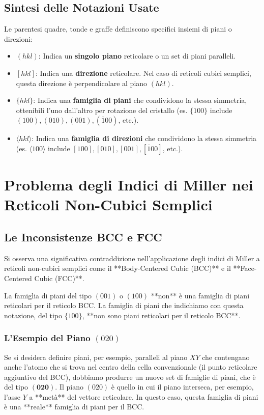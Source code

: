 \subsection{Sintesi delle Notazioni Usate}

Le parentesi quadre, tonde e graffe definiscono specifici insiemi di piani o direzioni:

\begin{itemize}
    \item \textbf{$(hkl)$}: Indica un \textbf{singolo piano} reticolare o un set di piani paralleli.
    \item \textbf{$[hkl]$}: Indica una \textbf{direzione} reticolare. Nel caso di reticoli cubici semplici, questa direzione è perpendicolare al piano $(hkl)$.
    \item \textbf{$\{hkl\}$}: Indica una \textbf{famiglia di piani} che condividono la stessa simmetria, ottenibili l'uno dall'altro per rotazione del cristallo (es. $\{100\}$ include $(100), (010), (001), (\bar{1}00)$, etc.).
    \item \textbf{$\langle hkl \rangle$}: Indica una \textbf{famiglia di direzioni} che condividono la stessa simmetria (es. $\langle 100 \rangle$ include $[100], [010], [001], [\bar{1}00]$, etc.).
\end{itemize}

\section{Problema degli Indici di Miller nei Reticoli Non-Cubici Semplici}

\subsection{Le Inconsistenze BCC e FCC}

Si osserva una significativa contraddizione nell'applicazione degli indici di Miller a reticoli non-cubici semplici come il **Body-Centered Cubic (BCC)** e il **Face-Centered Cubic (FCC)**.

La famiglia di piani del tipo $(001)$ o $(100)$ **non** è una famiglia di piani reticolari per il reticolo BCC. La famiglia di piani che indichiamo con questa notazione, del tipo $\{100\}$, **non sono piani reticolari per il reticolo BCC**.

\subsubsection{L'Esempio del Piano \texorpdfstring{$(020)$}{(020)}}
Se si desidera definire piani, per esempio, paralleli al piano $XY$ che contengano anche l'atomo che si trova nel centro della cella convenzionale (il punto reticolare aggiuntivo del BCC), dobbiamo produrre un nuovo set di famiglie di piani, che è del tipo $\mathbf{(020)}$.
Il piano $(020)$ è quello in cui il piano interseca, per esempio, l'asse $Y$ a **metà** del vettore reticolare. In questo caso, questa famiglia di piani è una **reale** famiglia di piani per il BCC.

